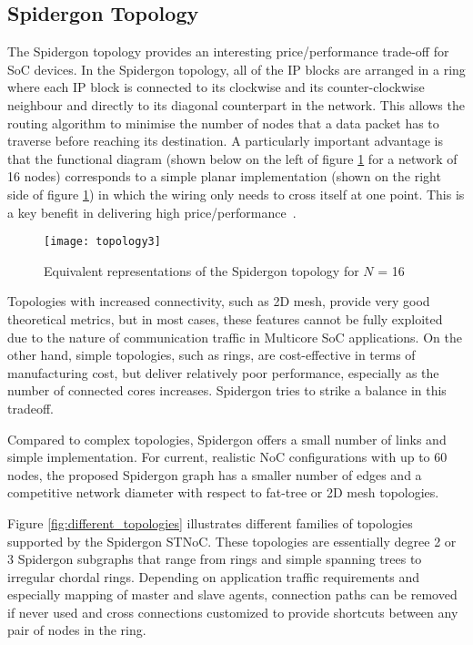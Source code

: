 \subsection{Spidergon Topology}\label{S:topology}

The Spidergon topology provides an interesting price/performance trade-off for SoC devices. 
In the Spidergon topology, all of the IP blocks are arranged in a ring where each IP block is connected to its clockwise and its counter-clockwise neighbour and directly to its diagonal counterpart in the network. 
This allows the routing algorithm to minimise the number of nodes that a data packet has to traverse before reaching its destination. 
A particularly important advantage is that the functional diagram (shown below on the left of figure \ref{fig:topology} for a network of 16 nodes) corresponds to a simple planar implementation (shown on the right side of figure \ref{fig:topology}) in which the wiring only needs to cross itself at one point. This is a key benefit in delivering high price/performance~\cite{STMicroelectronics2005}.

	\begin{figure}[ht]
	\centering
		\texttt{[image: topology3]}
		\caption{Equivalent representations of the Spidergon topology for ${N}$ = 16}
		\label{fig:topology}
	\end{figure}

Topologies with increased connectivity, such as 2D mesh, provide very good theoretical metrics, but in most cases, these features cannot be fully exploited due to the nature of communication traffic in Multicore SoC applications. 
On the other hand, simple topologies, such as rings, are cost-effective in terms of manufacturing cost, but deliver relatively poor performance, especially as the number of connected cores increases. Spidergon tries to strike a balance in this tradeoff. 

Compared to complex topologies, Spidergon offers a small number of links and simple implementation. For current, realistic NoC configurations with up to 60 nodes, the proposed Spidergon graph has a smaller number of edges and a competitive network diameter with respect to fat-tree or 2D mesh topologies.

Figure \ref{fig:different_topologies} illustrates different families of topologies supported by the Spidergon STNoC. 
These topologies are essentially degree 2 or 3 Spidergon subgraphs that range from rings and simple spanning trees to irregular chordal rings. 
Depending on application traffic requirements and especially mapping of master and slave agents, connection paths can be removed if never used and cross connections customized to provide shortcuts between any pair of nodes in the ring.

